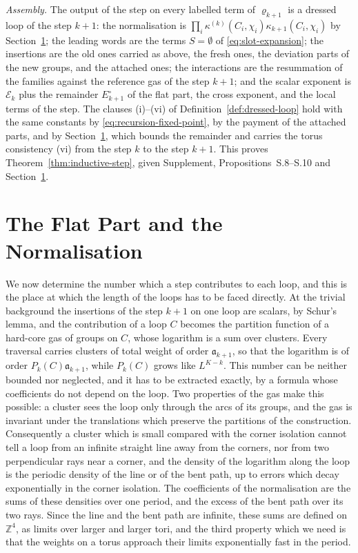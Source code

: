 \documentclass[11pt]{preprint}
\numberwithin{equation}{section}
\theoremstyle{definition}
\theoremstyle{remark}
\theoremstyle{plain}
\begin{document}
\emph{Assembly.} The output of the step on every labelled term of $\varrho_{k+1}$ is a dressed loop of the step $k + 1$: the normalisation is $\prod_i\kappa^{(k)}(C_i, \chi_i)\kappa_{k+1}(C_i, \chi_i)$ by Section~\ref{sec:flat-part}; the leading words are the terms $S = \emptyset$ of \eqref{eq:slot-expansion}; the insertions are the old ones carried as above, the fresh ones, the deviation parts of the new groups, and the attached ones; the interactions are the resummation of the families against the reference gas of the step $k + 1$; and the scalar exponent is $\mathcal E_k$ plus the remainder $E^\circ_{k+1}$ of the flat part, the cross exponent, and the local terms of the step. The clauses (i)--(vi) of Definition~\ref{def:dressed-loop} hold with the same constants by \eqref{eq:recursion-fixed-point}, by the payment of the attached parts, and by Section~\ref{sec:flat-part}, which bounds the remainder and carries the torus consistency (vi) from the step $k$ to the step $k + 1$. This proves Theorem~\ref{thm:inductive-step}, given Supplement, Propositions~S.8--S.10 and Section~\ref{sec:flat-part}.

\section{The Flat Part and the Normalisation}\label{sec:flat-part}

We now determine the number which a step contributes to each loop, and this is the place at which the length of the loops has to be faced directly. At the trivial background the insertions of the step $k + 1$ on one loop are scalars, by Schur's lemma, and the contribution of a loop $C$ becomes the partition function of a hard-core gas of groups on $C$, whose logarithm is a sum over clusters. Every traversal carries clusters of total weight of order $\mathfrak a_{k+1}$, so that the logarithm is of order $P_k(C)\mathfrak a_{k+1}$, while $P_k(C)$ grows like $L^{K-k}$. This number can be neither bounded nor neglected, and it has to be extracted exactly, by a formula whose coefficients do not depend on the loop. Two properties of the gas make this possible: a cluster sees the loop only through the arcs of its groups, and the gas is invariant under the translations which preserve the partitions of the construction. Consequently a cluster which is small compared with the corner isolation cannot tell a loop from an infinite straight line away from the corners, nor from two perpendicular rays near a corner, and the density of the logarithm along the loop is the periodic density of the line or of the bent path, up to errors which decay exponentially in the corner isolation. The coefficients of the normalisation are the sums of these densities over one period, and the excess of the bent path over its two rays. Since the line and the bent path are infinite, these sums are defined on $\mathbb Z^4$, as limits over larger and larger tori, and the third property which we need is that the weights on a torus approach their limits exponentially fast in the period.
\end{document}

